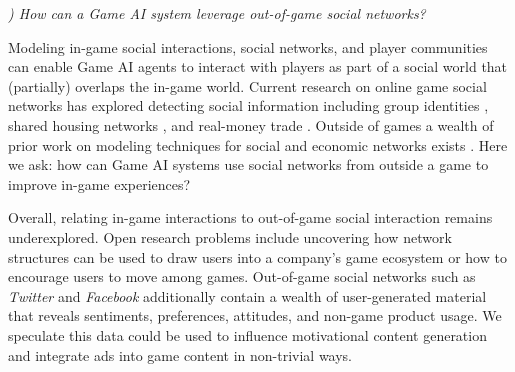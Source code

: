 \documentclass[conference]{IEEEtran}
\newcounter{questionno}
\newcommand{\subsubsectionx}[1]{{\em {\arabic{questionno}) #1}}
	\addtocounter{questionno}{1}
	}
\begin{document}


\subsubsectionx{How can a Game AI system leverage out-of-game social networks?}
%
Modeling in-game social interactions, social networks, and player communities can enable Game AI agents to interact with players as part of a social world that (partially) overlaps the in-game world. 
Current research on online game social networks has explored detecting social information including group identities \cite{grappiolo2013:group-identification}, shared housing networks \cite{ahmad2011:goldmining-hypergraph}, and real-money trade \cite{fujita2011:rmt-detect}. 
Outside of games a wealth of prior work on modeling techniques for social and economic networks exists \cite{jackson2010:soc-econ-networks}.
Here we ask: how can Game AI systems use social networks from outside a game to improve in-game experiences?

Overall, relating in-game interactions to out-of-game social interaction remains underexplored.
Open research problems include uncovering how network structures can be used to draw users into a company's game ecosystem or how to encourage users to move among games.
Out-of-game social networks such as {\em Twitter} and {\em Facebook} additionally contain a wealth of user-generated material that reveals sentiments, preferences, attitudes, and non-game product usage.
We speculate this data could be used to influence motivational content generation and integrate ads into game content in non-trivial ways.
%
\end{document}
